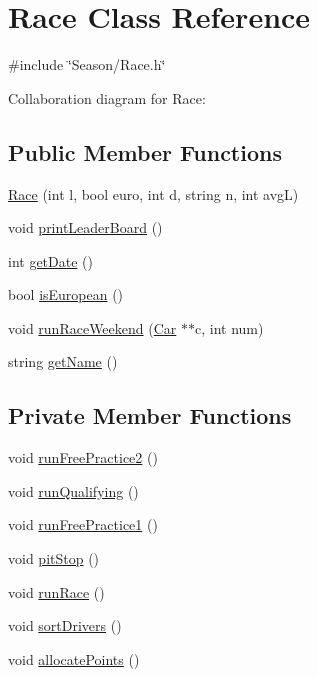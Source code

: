 \hypertarget{classRace}{}\section{Race Class Reference}
\label{classRace}


{\ttfamily \#include \char`\"{}Season/\+Race.\+h\char`\"{}}



Collaboration diagram for Race\+:
\subsection*{Public Member Functions}
\begin{DoxyCompactItemize}
\item 
\hyperlink{classRace_aac8d492b10c760c0fb0a5e0b0e013dca}{Race} (int l, bool euro, int d, string n, int avgL)
\item 
void \hyperlink{classRace_a137e1b46846619d85d1fd5af06cb9a44}{print\+Leader\+Board} ()
\item 
int \hyperlink{classRace_ac8130e3ce8bc18a208071937058100c9}{get\+Date} ()
\item 
bool \hyperlink{classRace_a1fb45997b626b183e86e1726d91d1263}{is\+European} ()
\item 
void \hyperlink{classRace_a3ebb8fd22b1873fa3bb4d9df0bd839a3}{run\+Race\+Weekend} (\hyperlink{classCar}{Car} $\ast$$\ast$c, int num)
\item 
string \hyperlink{classRace_a8375cd2498a798c9a25c8459768b1ee8}{get\+Name} ()
\end{DoxyCompactItemize}
\subsection*{Private Member Functions}
\begin{DoxyCompactItemize}
\item 
void \hyperlink{classRace_a5a4e8d13d043114b2260e297b2f00b0c}{run\+Free\+Practice2} ()
\item 
void \hyperlink{classRace_ad10dda455090692cb7fc05cd5fdf66aa}{run\+Qualifying} ()
\item 
void \hyperlink{classRace_a0f2422e16378be067631eaa7c370e09c}{run\+Free\+Practice1} ()
\item 
void \hyperlink{classRace_a79ac9d5338dce7e35a17d77b4b6f85b1}{pit\+Stop} ()
\item 
void \hyperlink{classRace_a753f045468dd1c6db5ed2aa1e0202cf1}{run\+Race} ()
\item 
void \hyperlink{classRace_a11e9a7fa89848e8dff07c4703f7bbdea}{sort\+Drivers} ()
\item 
void \hyperlink{classRace_abed9e74190e4eb7bdb76883659c4b345}{allocate\+Points} ()
\end{DoxyCompactItemize}
